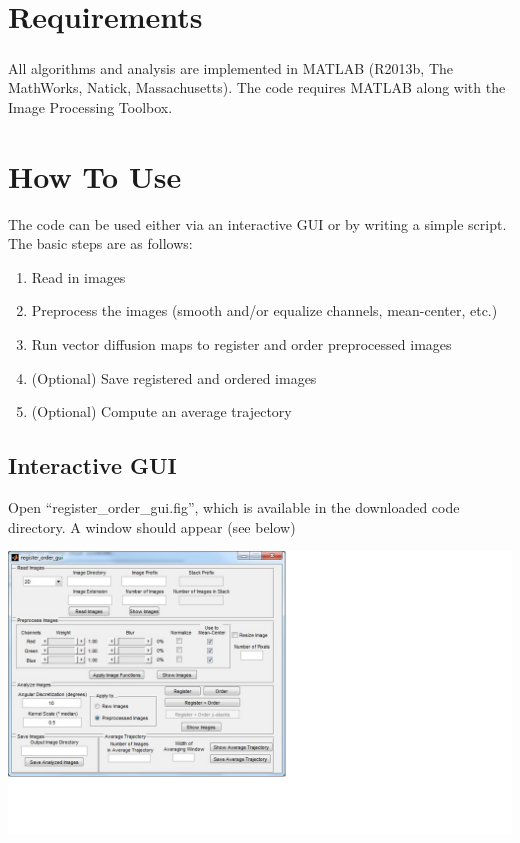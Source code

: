 \documentclass[12pt]{article}
\begin{document}
\section{Requirements}

All algorithms and analysis are implemented in MATLAB\textsuperscript{\textregistered} (R2013b, The MathWorks, Natick, Massachusetts).
%
The code requires MATLAB along with the Image Processing Toolbox. 

\section{How To Use}

The code can be used either via an interactive GUI
or by writing a simple script.
%
The basic steps are as follows:
\begin{enumerate}
   \item Read in images
   \item Preprocess the images (smooth and/or equalize channels, mean-center, etc.)
   \item Run vector diffusion maps to register and order preprocessed images
   \item (Optional) Save registered and ordered images
   \item (Optional) Compute an average trajectory
\end{enumerate}

\subsection{Interactive GUI}

Open ``register\_order\_gui.fig'', which is available in the downloaded code directory.
%
A window should appear (see below)

\includegraphics[width=\textwidth, trim=0cm 3cm 12cm 0cm, clip]{gui_screenshot_initial.jpg}
\end{document}

